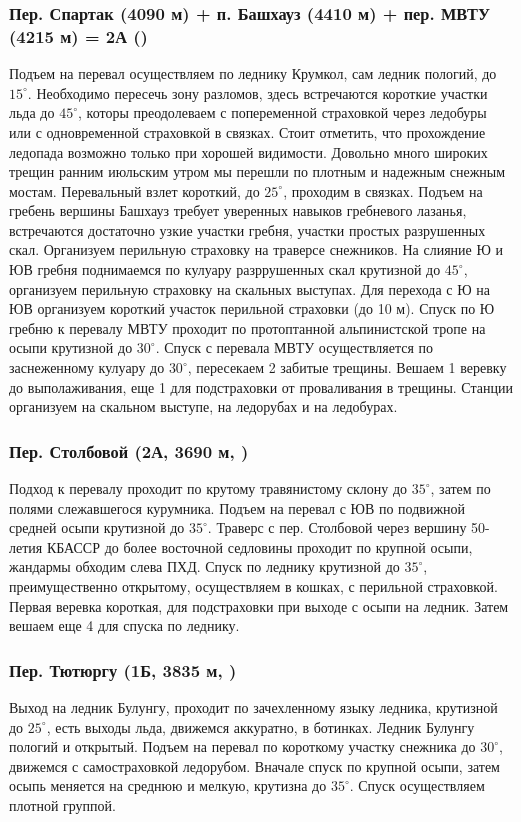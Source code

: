 		\subsubsection*{Пер. Спартак (4090 м) + п. Башхауз (4410 м) + пер. МВТУ (4215 м) = 2А ()}
			Подъем на перевал осуществляем по леднику Крумкол, сам ледник пологий, до $15^\circ$. Необходимо
			пересечь зону разломов, здесь встречаются короткие участки льда до $45^\circ$, которы преодолеваем
			с попеременной страховкой через ледобуры или с одновременной страховкой в связках. Стоит отметить,
			что прохождение ледопада возможно только при хорошей видимости. Довольно много широких трещин ранним
			июльским утром мы перешли по плотным и надежным снежным мостам. Перевальный взлет короткий, до $25^\circ$,
			проходим в связках. Подъем на гребень вершины Башхауз требует уверенных навыков гребневого лазанья,
			встречаются достаточно узкие участки гребня, участки простых разрушенных скал. Организуем перильную
			страховку на траверсе снежников. На слияние Ю и ЮВ гребня поднимаемся по кулуару разррушенных скал
			крутизной до $45^\circ$, организуем перильную страховку на скальных выступах. Для перехода с Ю на ЮВ
			организуем короткий участок перильной страховки (до 10 м). Спуск по Ю гребню к перевалу МВТУ проходит
			по протоптанной альпинистской тропе на осыпи крутизной до $30^\circ$. Спуск с перевала МВТУ
			осуществляется по заснеженному кулуару до $30^\circ$, пересекаем 2 забитые трещины. Вешаем 1 веревку до
			выполаживания, еще 1 для подстраховки от проваливания в трещины. Станции организуем на скальном выступе,
			на ледорубах и на ледобурах.

		\subsubsection*{Пер. Столбовой (2А, 3690 м, )}
			Подход к перевалу проходит по крутому травянистому склону  до $35^\circ$, затем по полями слежавшегося
			курумника. Подъем на перевал с ЮВ по подвижной средней осыпи крутизной до $35^\circ$. Траверс с
			пер. Столбовой через вершину 50-летия КБАССР до более восточной седловины проходит по крупной осыпи,
			жандармы обходим слева ПХД. Спуск по леднику крутизной до $35^\circ$, преимущественно открытому,
			осуществляем в кошках, с перильной страховкой. Первая веревка короткая, для подстраховки при выходе
			с осыпи на ледник. Затем вешаем еще 4 для спуска по леднику.
		
		\subsubsection*{Пер. Тютюргу (1Б, 3835 м, )}
			Выход на ледник Булунгу, проходит по зачехленному языку ледника, крутизной до $25^\circ$, есть выходы
			льда, движемся аккуратно, в ботинках. Ледник Булунгу пологий и открытый. Подъем на перевал по короткому
			участку снежника до $30^\circ$, движемся с самостраховкой ледорубом. Вначале спуск по крупной осыпи,
			затем осыпь меняется на среднюю и мелкую, крутизна до $35^\circ$. Спуск осуществляем плотной группой.
		
